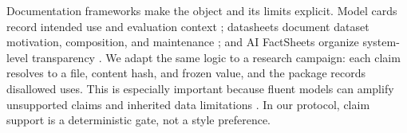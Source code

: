 Documentation frameworks make the object and its limits explicit. Model cards
record intended use and evaluation context \cite{mitchell2019modelcards};
datasheets document dataset motivation, composition, and maintenance
\cite{gebru2021datasheets}; and AI FactSheets organize system-level
transparency \cite{arnold2019factsheets}. We adapt the same logic to a research
campaign: each claim resolves to a file, content hash, and frozen value, and
the package records disallowed uses. This is especially important because
fluent models can amplify unsupported claims and inherited data limitations
\cite{bender2021stochastic}. In our protocol, claim support is a deterministic
gate, not a style preference.
